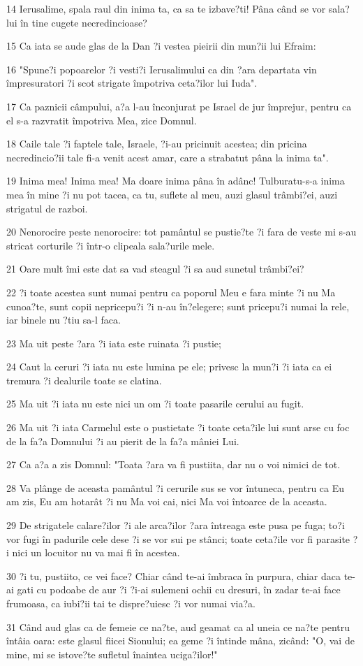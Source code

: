 \par 14 Ierusalime, spala raul din inima ta, ca sa te izbave?ti! Pâna când se vor sala?lui în tine cugete necredincioase?
\par 15 Ca iata se aude glas de la Dan ?i vestea pieirii din mun?ii lui Efraim:
\par 16 "Spune?i popoarelor ?i vesti?i Ierusalimului ca din ?ara departata vin împresuratori ?i scot strigate împotriva ceta?ilor lui Iuda".
\par 17 Ca paznicii câmpului, a?a l-au înconjurat pe Israel de jur împrejur, pentru ca el s-a razvratit împotriva Mea, zice Domnul.
\par 18 Caile tale ?i faptele tale, Israele, ?i-au pricinuit acestea; din pricina necredincio?ii tale fi-a venit acest amar, care a strabatut pâna la inima ta".
\par 19 Inima mea! Inima mea! Ma doare inima pâna în adânc! Tulburatu-s-a inima mea în mine ?i nu pot tacea, ca tu, suflete al meu, auzi glasul trâmbi?ei, auzi strigatul de razboi.
\par 20 Nenorocire peste nenorocire: tot pamântul se pustie?te ?i fara de veste mi s-au stricat corturile ?i într-o clipeala sala?urile mele.
\par 21 Oare mult îmi este dat sa vad steagul ?i sa aud sunetul trâmbi?ei?
\par 22 ?i toate acestea sunt numai pentru ca poporul Meu e fara minte ?i nu Ma cunoa?te, sunt copii nepricepu?i ?i n-au în?elegere; sunt pricepu?i numai la rele, iar binele nu ?tiu sa-l faca.
\par 23 Ma uit peste ?ara ?i iata este ruinata ?i pustie;
\par 24 Caut la ceruri ?i iata nu este lumina pe ele; privesc la mun?i ?i iata ca ei tremura ?i dealurile toate se clatina.
\par 25 Ma uit ?i iata nu este nici un om ?i toate pasarile cerului au fugit.
\par 26 Ma uit ?i iata Carmelul este o pustietate ?i toate ceta?ile lui sunt arse cu foc de la fa?a Domnului ?i au pierit de la fa?a mâniei Lui.
\par 27 Ca a?a a zis Domnul: "Toata ?ara va fi pustiita, dar nu o voi nimici de tot.
\par 28 Va plânge de aceasta pamântul ?i cerurile sus se vor întuneca, pentru ca Eu am zis, Eu am hotarât ?i nu Ma voi cai, nici Ma voi întoarce de la aceasta.
\par 29 De strigatele calare?ilor ?i ale arca?ilor ?ara întreaga este pusa pe fuga; to?i vor fugi în padurile cele dese ?i se vor sui pe stânci; toate ceta?ile vor fi parasite ?i nici un locuitor nu va mai fi în acestea.
\par 30 ?i tu, pustiito, ce vei face? Chiar când te-ai îmbraca în purpura, chiar daca te-ai gati cu podoabe de aur ?i ?i-ai sulemeni ochii cu dresuri, în zadar te-ai face frumoasa, ca iubi?ii tai te dispre?uiesc ?i vor numai via?a.
\par 31 Când aud glas ca de femeie ce na?te, aud geamat ca al uneia ce na?te pentru întâia oara: este glasul fiicei Sionului; ea geme ?i întinde mâna, zicând: "O, vai de mine, mi se istove?te sufletul înaintea uciga?ilor!"

